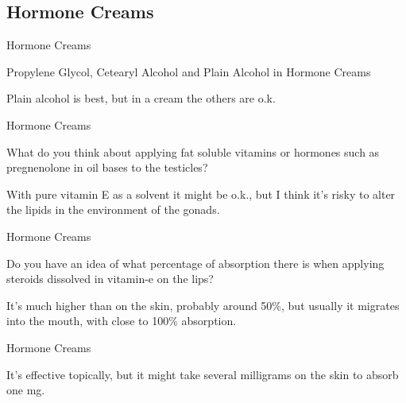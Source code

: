 \documentclass[11pt,oneside,openany,extrafontsizes]{memoir}
\begin{document}
\subsection{Hormone Creams}

\begin{standalonequote}{Hormone Creams}
    \begin{note}
        Propylene Glycol, Cetearyl Alcohol and Plain Alcohol in Hormone Creams
    \end{note}

    \begin{answer}
        Plain alcohol is best, but in a cream the others are o.k.
    \end{answer}
\end{standalonequote}

\begin{qaexchange}{Hormone Creams}

    \begin{question}
        What do you think about applying fat soluble vitamins or hormones such as pregnenolone in oil bases to the testicles?
    \end{question}

    \begin{answer}
       With pure vitamin E as a solvent it might be o.k., but I think it's risky to alter the lipids in the environment of the gonads. 
    \end{answer}
\end{qaexchange}

\begin{qaexchange}{Hormone Creams}

    \begin{question}
        Do you have an idea of what percentage of absorption there is when applying steroids dissolved in vitamin-e on the lips?
    \end{question}

    \begin{answer}
      It's much higher than on the skin, probably around 50\%, but usually it migrates into the mouth, with close to 100\% absorption.
    \end{answer}
\end{qaexchange}

\begin{standalonequote}{Hormone Creams}

    \begin{answer}
      It's effective topically, but it might take several milligrams on the skin to absorb one mg.
    \end{answer}
\end{standalonequote}
\end{document}
